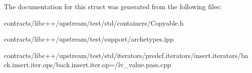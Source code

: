The documentation for this struct was generated from the following files\+:\begin{DoxyCompactItemize}
\item 
contracts/libc++/upstream/test/std/containers/Copyable.\+h\item 
contracts/libc++/upstream/test/support/archetypes.\+ipp\item 
contracts/libc++/upstream/test/std/iterators/predef.\+iterators/insert.\+iterators/back.\+insert.\+iter.\+ops/back.\+insert.\+iter.\+op=/lv\+\_\+value.\+pass.\+cpp\end{DoxyCompactItemize}
